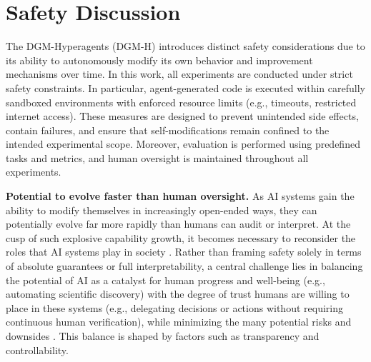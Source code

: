 \documentclass{article}
\newif\ifcomment
\newcommand{\todo}[1]{\textcolor{red}{\ifcomment(\textbf{TODO}: #1)\else\fi}}
\begin{document}



% 

\section{Safety Discussion}
\label{app:safety}

The DGM-Hyperagents (DGM-H) introduces distinct safety considerations due to its ability to autonomously modify its own behavior and improvement mechanisms over time. In this work, all experiments are conducted under strict safety constraints. In particular, agent-generated code is executed within carefully sandboxed environments with enforced resource limits (e.g., timeouts, restricted internet access). These measures are designed to prevent unintended side effects, contain failures, and ensure that self-modifications remain confined to the intended experimental scope. Moreover, evaluation is performed using predefined tasks and metrics, and human oversight is maintained throughout all experiments.

\textbf{Potential to evolve faster than human oversight.}
As AI systems gain the ability to modify themselves in increasingly open-ended ways, they can potentially evolve far more rapidly than humans can audit or interpret. At the cusp of such explosive capability growth, it becomes necessary to reconsider the roles that AI systems play in society \citep{bengio2024managing}. Rather than framing safety solely in terms of absolute guarantees or full interpretability, a central challenge lies in balancing the potential of AI as a catalyst for human progress and well-being (e.g., automating scientific discovery) with the degree of trust humans are willing to place in these systems (e.g., delegating decisions or actions without requiring continuous human verification), while minimizing the many potential risks and downsides \citep{clune2019ai, ecoffet2020open, bengio2024managing, weston2025ai}. This balance is shaped by factors such as transparency and controllability.
\end{document}
